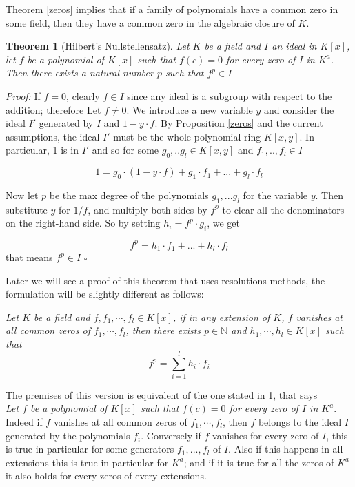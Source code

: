 \documentclass[a4paper,12pt,oneside]{book}
\newtheorem{theorem}{Theorem}[chapter]
\newcommand*{\QED}{\hfill\ensuremath{\square}}
\begin{document}
Theorem \ref{zeros} implies that if a family of polynomials have a common zero in some field, then they have a common zero in the algebraic closure of $K$. 

\begin{theorem}[Hilbert's Nullstellensatz]\label{langsnulls}
Let $K$ be a field and $I$ an ideal in $K[x]$, let $f$ be a polynomial of $K[x]$ such that $f(c)=0$ for every zero of $I$ in $K^a$. Then there exists a natural number $p$ such that $f^p\in I$
\end{theorem}

\textit{Proof:} If $f=0$, clearly $f\in I$ since any ideal is a subgroup with respect to the addition; therefore  Let $f\neq 0$. We introduce a new variable $y$ and consider the ideal $I'$ generated by $I$ and $1-y\cdot f$. By Proposition \ref{zeros} and the current assumptions, the ideal $I'$ must be the whole polynomial ring $K[x,y]$. In particular, 1 is in $I'$ and so for some $g_0,..g_l\in K[x,y]$ and $f_1,..,f_l\in I$

$$ 1= g_0 \cdot (1-y\cdot f) + g_1\cdot f_1 + ...+ g_l\cdot f_l  $$ 

\noindent Now let $p$ be the max degree of the polynomials $g_1,...g_l$ for the variable $y$. Then
substitute $y$ for $1/f$, and multiply both sides by  $f^p$ to clear all the denominators on the right-hand side. So by setting $h_i= f^p \cdot g_i$, we get

$$ f^p= h_1\cdot f_1 + ...+ h_l\cdot f_l   $$
that means $f^p\in I$  \QED

\noindent Later we will see a proof of this theorem that uses resolutions methods, the formulation will be slightly different as follows:

\noindent\textit{Let $K$ be a field and $f,f_1,\cdots, f_l \in K[{x}]$, if in any extension of $K$, $f$ vanishes at all common zeros of $f_1,\cdots, f_l$, then there exists $p\in \mathbb{N}$ and $h_1,\cdots, h_l \in K[{x}]$ such that} 
$$
f^p = \sum_{i=1}^l h_i \cdot f_i
$$

\noindent The premises of this version is equivalent of the one stated in \ref{langsnulls}, that says\\ \textit{Let $f$ be a polynomial of $K[x]$ such that $f(c)=0$ for every zero of $I$ in $K^a$}.
 Indeed if $f$ vanishes at all common zeros of $f_1,\cdots, f_l$, then $f$ belongs to the ideal $I$ generated by the polynomials  $f_i$. Conversely if $f$ vanishes for every zero of $I$, this is true in particular for some generators $f_1,...,f_l$ of $I$. Also if this happens in all extensions this is true in particular for $K^a$; and if it is true for all the zeros of $K^a$ it also holds for every zeros of every extensions.
\end{document}
